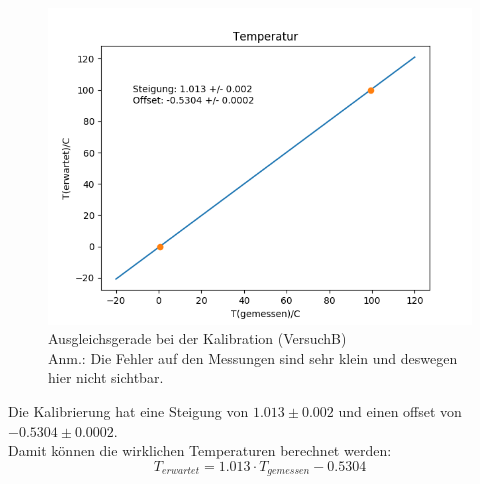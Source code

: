 \documentclass[12pt,a4paper]{article}
\begin{document}
\begin{figure}
\includegraphics[width=\linewidth]{Bilder/KalibrationB}
\begin{center}
\caption[KalibrationB]{Ausgleichsgerade bei der Kalibration (VersuchB)\\
Anm.: Die Fehler auf den Messungen sind sehr klein und deswegen hier nicht sichtbar.}
\label{fig:GeradeKaliB}
\end{center}
\end{figure}

Die Kalibrierung hat eine Steigung von $1.013\pm 0.002$ und einen offset von $-0.5304\pm 0.0002$.\\
Damit können die wirklichen Temperaturen berechnet werden:
\begin{equation}
T_{erwartet}=1.013\cdot T_{gemessen}-0.5304
\end{equation}
\end{document}
